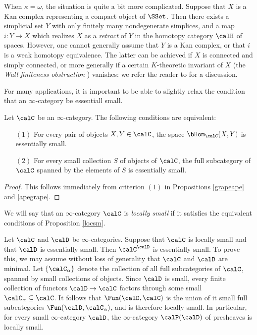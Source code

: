 \begin{remark}
When $\kappa = \omega$, the situation is quite a bit more complicated. Suppose that
$X$ is a Kan complex representing a compact object of $\SSet$. Then there exists a simplicial set $Y$ with only finitely many nondegenerate simplices, and a map $i: Y \rightarrow X$ which
realizes $X$ as a {\em retract} of $Y$ in the homotopy category $\calH$ of spaces. However, one cannot generally assume that $Y$ is a Kan complex, or that $i$ is a weak homotopy equivalence.
The latter can be achieved if $X$ is connected and simply connected, or more generally if a certain $K$-theoretic invariant of $X$ (the {\em Wall finiteness obstruction} ) vanishes: we refer the reader to \cite{wall} for a discussion.
\end{remark}

For many applications, it is important to be able to slightly relax the condition that an $\infty$-category be essentiall small.

\begin{proposition}\label{locsm}
Let $\calC$ be an $\infty$-category. The following conditions are equivalent:
\begin{itemize}
\item[$(1)$] For every pair of objects $X,Y \in \calC$, the space
$\bHom_{\calC}(X,Y)$ is essentially small.
\item[$(2)$] For every small collection $S$ of objects of $\calC$, the full subcategory
of $\calC$ spanned by the elements of $S$ is essentially small.
\end{itemize}
\end{proposition}

\begin{proof}
This follows immediately from criterion $(1)$ in Propositions \ref{grapeape} and \ref{apegrape}.
\end{proof}

We will say that an $\infty$-category $\calC$ is {\it locally small} if it satisfies the
equivalent conditions of Proposition \ref{locsm}.

\begin{example}\label{exlocsm}
Let $\calC$ and $\calD$ be $\infty$-categories. Suppose that $\calC$ is locally small and that $\calD$ is essentially small. Then $\calC^{\calD}$ is essentially small. To prove this, we may assume without loss of generality that $\calC$ and $\calD$ are minimal. Let
$\{ \calC_{\alpha} \}$ denote the collection of all full subcategories of $\calC$, spanned by small collections of objects. Since $\calD$ is small, every finite collection of functors
$\calD \rightarrow \calC$ factors through some small $\calC_{\alpha} \subseteq \calC$. 
It follows that $\Fun(\calD,\calC)$ is the union of it small full subcategories $\Fun(\calD, \calC_{\alpha})$, and is therefore locally small. In particular, for every small $\infty$-category $\calD$, the $\infty$-category $\calP(\calD)$ of presheaves is locally small.
\end{example}

